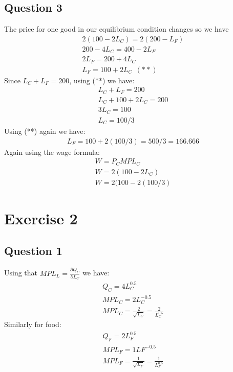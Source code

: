 \documentclass{article}
\begin{document}
\par \vspace{0.8em}
\subsection{Question 3}

The price for one good in our equilibrium condition changes so we have
\begin{gather*}
  2(100 - 2L_{C}) = 2(200 - L_{F}) \\
  200 - 4L_{C} = 400 - 2L_{F} \\
  2L_{F} = 200 + 4L_{C} \\
  L_{F} = 100 + 2L_{C} \ \ (**)
\end{gather*}
Since $L_{C} + L_{F} = 200$, using (**) we have:
\begin{gather*}
  L_{C} + L_{F} = 200 \\
  L_{C} + 100 + 2L_{C} = 200 \\
  3L_{C} = 100 \\
  L_{C} = 100/3
\end{gather*}
Using (**) again we have:
\begin{gather*}
  L_{F} = 100 + 2(100/3) = 500/3 = 166.666
\end{gather*}
Again using the wage formula:
\begin{gather*}
  W = P_{C}MPL_{C} \\
  W = 2(100 - 2L_{C}) \\
  W = 2(100 - 2(100/3)
\end{gather*}


\section{Exercise 2}
\vspace{6mm}
\subsection{Question 1}

Using that $MPL_{L} = \tfrac{\partial Q_{C}}{\partial L_{C}}$ we have:
\begin{gather*}
  Q_{C} = 4L_{C}^{0.5} \\
  MPL_{C} = 2L_{C}^{-0.5} \\
  MPL_{C} = \tfrac{2}{\sqrt{L_{C}}} = \tfrac{2}{L_{C}^{0.5}}
\end{gather*}
Similarly for food:
\begin{gather*}
  Q_{F} = 2L_{F}^{0.5} \\
  MPL_{F} = 1LF^{-0.5} \\
  MPL_{F} = \tfrac{1}{\sqrt{L_{F}}} = \tfrac{1}{L_{F}^{0.5}}
\end{gather*}
\end{document}
